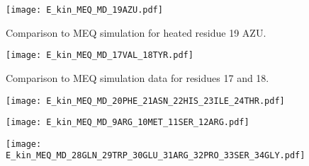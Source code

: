 \documentclass[11pt, a4paper]{report}
\begin{document}
\begin{figure}[h]
  \centering
  \texttt{[image: E\_kin\_MEQ\_MD\_19AZU.pdf]}
  \caption{Comparison to MEQ simulation for heated residue 19 AZU.}
  \label{fig:E_kin_MEQ_19AZU}
\end{figure}

\begin{figure}[h]
  \centering
  \texttt{[image: E\_kin\_MEQ\_MD\_17VAL\_18TYR.pdf]}
  \caption{Comparison to MEQ simulation data for residues 17 and 18.}
  \label{fig:E_kin_MEQ_MD_17VAL_18TYR}
\end{figure}

\begin{figure}[h]
  \centering
  \texttt{[image: E\_kin\_MEQ\_MD\_20PHE\_21ASN\_22HIS\_23ILE\_24THR.pdf]}
  \label{fig:E_kin_MEQ_MD_20PHE_21ASN_22HIS_23ILE_24THR}
\end{figure}

\begin{figure}[h]
  \centering
  \texttt{[image: E\_kin\_MEQ\_MD\_9ARG\_10MET\_11SER\_12ARG.pdf]}
  \label{fig:E_kin_MEQ_MD_9ARG_10MET_11SER_12ARG}
\end{figure}


\begin{figure}[h]
  \centering
  \texttt{[image: E\_kin\_MEQ\_MD\_28GLN\_29TRP\_30GLU\_31ARG\_32PRO\_33SER\_34GLY.pdf]}
  \label{fig:E_kin_MEQ_MD_28GLN_29TRP_30GLU_31ARG_32PRO_33SER_34GLY}
\end{figure}
\end{document}
